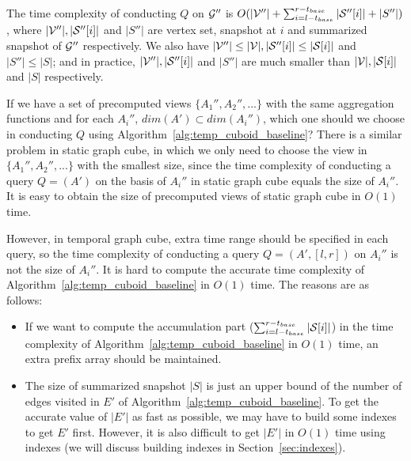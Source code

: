 \documentclass[10pt,journal,compsoc]{IEEEtran}
\begin{document}
The time complexity of conducting $ Q $ on $ \mathcal{G}'' $ is $ O(|\mathcal{V}''|+\sum_{i=l-t_{base}}^{r-t_{base}}|\mathcal{S}''[i]|+|S''|) $, where $ |\mathcal{V}''|,|\mathcal{S}''[i]| $ and $ |S''| $ are vertex set, snapshot at $ i $ and summarized snapshot of $ \mathcal{G}'' $ respectively. We also have $ |\mathcal{V}''| \leq |\mathcal{V}|,|\mathcal{S}''[i]| \leq |\mathcal{S}[i]|$ and $|S''| \leq |S| $; and in practice, $ |\mathcal{V}''|,|\mathcal{S}''[i]| $ and $ |S''| $ are much smaller than $ |\mathcal{V}|,|\mathcal{S}[i]| $ and $ |S| $ respectively.

If we have a set of precomputed views $ \{A_1'',A_2'',...\} $ with the same aggregation functions and for each $ A_i'' $, $ dim(A') \subset dim(A_i'') $, which one should we choose in conducting $ Q $ using Algorithm~\ref{alg:temp_cuboid_baseline}? There is a similar problem in static graph cube, in which we only need to choose the view in $ \{A_1'',A_2'',...\} $ with the smallest size, since the time complexity of conducting a query $ Q=(A') $ on the basis of $ A_i'' $ in static graph cube equals the size of $ A_i'' $. It is easy to obtain the size of precomputed views of static graph cube in $ O(1) $ time.

However, in temporal graph cube, extra time range should be specified in each query, so the time complexity of conducting a query $ Q=(A',[l,r]) $ on $ A_i'' $ is not the size of $ A_i'' $. It is hard to compute the accurate time complexity of Algorithm~\ref{alg:temp_cuboid_baseline} in $ O(1) $ time. The reasons are as follows:
\begin{itemize}[leftmargin=*]
	\item If we want to compute the accumulation part ($ \sum_{i=l-t_{base}}^{r-t_{base}}|\mathcal{S}[i]| $) in the time complexity of Algorithm~\ref{alg:temp_cuboid_baseline} in $ O(1) $ time, an extra prefix array should be maintained.
	\item The size of summarized snapshot $ |S| $ is just an upper bound of the number of edges visited in $ E' $ of Algorithm~\ref{alg:temp_cuboid_baseline}. To get the accurate value of $ |E'| $ as fast as possible, we may have to build some indexes to get $ E' $ first. However, it is also difficult to get $ |E'| $ in $ O(1) $ time using indexes (we will discuss building indexes in Section~\ref{sec:indexes}).
\end{itemize}
\end{document}
